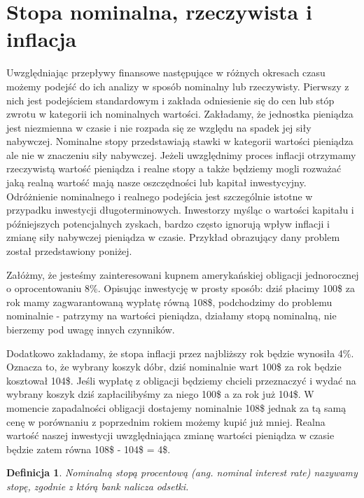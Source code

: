 \documentclass{mini}
\theoremstyle{mythstyle}
\newtheorem{Definicja}{Definicja}[chapter]
\begin{document}
	\section{Stopa nominalna, rzeczywista i inflacja}
	
	Uwzględniając przepływy finansowe następujące w różnych okresach czasu możemy podejść do ich analizy w sposób nominalny lub rzeczywisty. Pierwszy z nich jest podejściem standardowym i zakłada odniesienie się do cen lub stóp zwrotu w kategorii ich nominalnych wartości. Zakładamy, że jednostka pieniądza jest niezmienna w czasie i nie rozpada się ze względu na spadek jej siły nabywczej. Nominalne stopy przedstawiają stawki w kategorii wartości pieniądza ale nie w znaczeniu siły nabywczej. Jeżeli uwzględnimy proces inflacji otrzymamy rzeczywistą wartość pieniądza i realne stopy a także będziemy mogli rozważać jaką realną wartość mają nasze oszczędności lub kapitał inwestycyjny. Odróżnienie nominalnego i realnego podejścia jest szczególnie istotne w przypadku inwestycji długoterminowych. Inwestorzy myśląc o wartości kapitału i późniejszych potencjalnych zyskach, bardzo często ignorują wpływ inflacji i zmianę siły nabywczej pieniądza w czasie. Przykład obrazujący dany problem został przedstawiony poniżej.
	
	Załóżmy, że jesteśmy zainteresowani kupnem amerykańskiej obligacji jednorocznej o oprocentowaniu 8\%. Opisując inwestycję w prosty sposób: dziś płacimy 100\$ za rok mamy zagwarantowaną wypłatę równą 108\$, podchodzimy do problemu nominalnie - patrzymy na wartości pieniądza, działamy stopą nominalną, nie bierzemy pod uwagę innych czynników. 
			
	Dodatkowo zakładamy, że stopa inflacji przez najbliższy rok będzie  wynosiła 4\%. Oznacza to, że wybrany koszyk dóbr, dziś nominalnie wart 100\$ za rok będzie kosztował 104\$. Jeśli wypłatę z obligacji będziemy chcieli przeznaczyć i wydać na wybrany koszyk dziś zapłacilibyśmy za niego 100\$ a za rok już 104\$. W momencie zapadalności obligacji dostajemy nominalnie 108\$ jednak za tą samą cenę w porównaniu z poprzednim rokiem możemy kupić już mniej. Realna wartość naszej inwestycji uwzględniająca zmianę wartości pieniądza w czasie będzie zatem równa 108\$ - 104\$ = 4\$.\\
		
	\begin{Definicja}
			Nominalną stopą procentową (ang. nominal interest rate) nazywamy stopę, zgodnie z którą bank nalicza odsetki.
	\end{Definicja}
\end{document}
